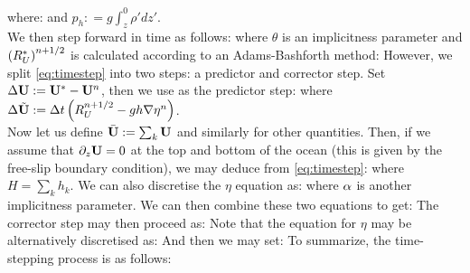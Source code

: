 \documentclass[10pt]{article}
\begin{document}
where:
and $p_{h} : = g\int_{z}^{0} \rho' dz' $. \\
\linebreak
We then step forward in time as follows:
where $\theta$ is an implicitness parameter and $\left(R_{U}^{*}\right)^{n+1/2}$ is calculated according to an Adams-Bashforth method:
However, we split \cref{eq:timestep} into two steps: a predictor and corrector step. Set $\Delta \mathbf{U} : = \mathbf{U}^{*} - \mathbf{U}^{n}$, then we use as the predictor step:
where $\Delta\tilde{\mathbf{U}} : = \Delta t\left(R_{U}^{n+1/2} - gh\nabla\eta^{n}\right)$. \\
\linebreak
Now let us define $\bar{\mathbf{U}}: = \sum_{k}\mathbf{U}$ and similarly for other quantities. Then, if we assume that $\partial_{z}\mathbf{U} = 0$ at the top and bottom of the ocean (this is given by the free-slip boundary condition), we may deduce from \cref{eq:timestep}:
where $H = \sum_{k} h_{k}$. We can also discretise the $\eta$ equation as:
where $\alpha$ is another implicitness parameter. We can then combine these two equations to get:
The corrector step may then proceed as:
Note that the equation for $\eta$ may be alternatively discretised as:
And then we may set:
To summarize, the time-stepping process is as follows:
\end{document}

